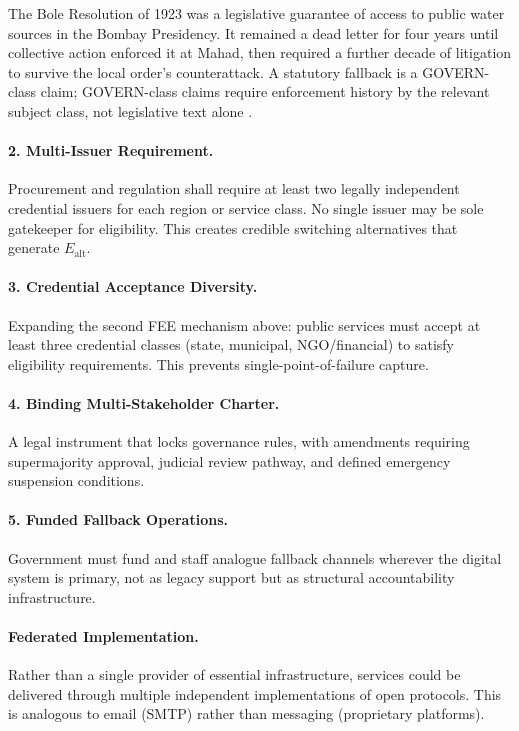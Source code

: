 \documentclass{article}
\begin{document}
The Bole Resolution of 1923 was a legislative guarantee of access to public water sources in the Bombay Presidency. It remained a dead letter for four years until collective action enforced it at Mahad, then required a further decade of litigation to survive the local order's counterattack. A statutory fallback is a GOVERN-class claim; GOVERN-class claims require enforcement history by the relevant subject class, not legislative text alone \citep{ambedkar1947states}.

\paragraph{2. Multi-Issuer Requirement.} Procurement and regulation shall require at least two legally independent credential issuers for each region or service class. No single issuer may be sole gatekeeper for eligibility. This creates credible switching alternatives that generate $E_{\text{alt}}$.

\paragraph{3. Credential Acceptance Diversity.} Expanding the second FEE mechanism above: public services must accept at least three credential classes (state, municipal, NGO/financial) to satisfy eligibility requirements. This prevents single-point-of-failure capture.

\paragraph{4. Binding Multi-Stakeholder Charter.} A legal instrument that locks governance rules, with amendments requiring supermajority approval, judicial review pathway, and defined emergency suspension conditions.

\paragraph{5. Funded Fallback Operations.} Government must fund and staff analogue fallback channels wherever the digital system is primary, not as legacy support but as structural accountability infrastructure.

\paragraph{Federated Implementation.} Rather than a single provider of essential infrastructure, services could be delivered through multiple independent implementations of open protocols. This is analogous to email (SMTP) rather than messaging (proprietary platforms).
\end{document}
